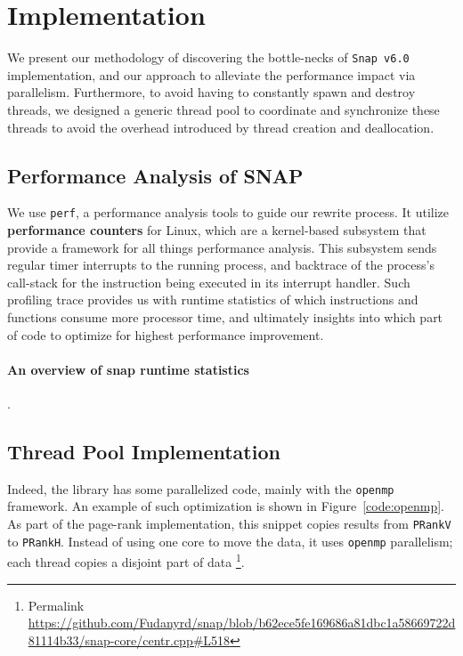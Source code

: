 \section{Implementation} \label{sec:impl}

\par We present our methodology of discovering the bottle-necks of 
\texttt{Snap v6.0} implementation, and our approach to alleviate the performance
impact via parallelism. Furthermore, to avoid having to constantly spawn and
destroy threads, we designed a generic thread pool to coordinate and 
synchronize these threads to avoid the overhead introduced by thread creation
and deallocation.


\subsection{Performance Analysis of \textbf{SNAP}}


\par We use \texttt{perf}\citep{linux-perf}, a performance analysis tools to 
guide our rewrite process. It utilize \textbf{performance counters} for Linux,
which are a kernel-based subsystem that provide a framework for all things 
performance analysis. This subsystem sends regular timer interrupts to the
running process, and backtrace of the process's call-stack for the instruction
being executed in its interrupt handler. Such profiling trace provides us with 
runtime statistics of which instructions and functions consume more processor 
time, and ultimately insights
into which part of code to optimize for highest performance improvement.

\paragraph{An overview of snap runtime statistics}. 

\subsection{Thread Pool Implementation}

\par Indeed, the \snap library has some parallelized code, mainly 
with the \texttt{openmp} framework\citep{openmp,embedded-hps}. An example
of such optimization is shown in Figure~\ref{code:openmp}. As part of the page-rank
implementation, this snippet copies results from \texttt{PRankV} to \texttt{PRankH}.
Instead of using one core to move the data, it uses \texttt{openmp} parallelism; 
each  thread copies a disjoint part of data
\footnote{Permalink 
\url{https://github.com/Fudanyrd/snap/blob/b62ece5fe169686a81dbc1a58669722d81114b33/snap-core/centr.cpp\#L518}}.

